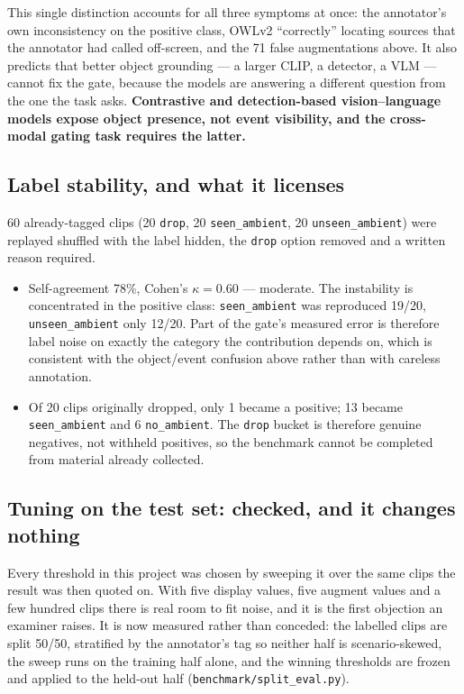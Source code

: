 \documentclass[11pt,a4paper]{article}
\begin{document}
This single distinction accounts for all three symptoms at once: the annotator's own
inconsistency on the positive class, OWLv2 ``correctly'' locating sources that the
annotator had called off-screen, and the 71 false augmentations above. It also predicts
that better object grounding --- a larger CLIP, a detector, a VLM --- cannot fix the
gate, because the models are answering a different question from the one the task asks.
\textbf{Contrastive and detection-based vision--language models expose object presence,
not event visibility, and the cross-modal gating task requires the latter.}

\subsection{Label stability, and what it licenses}\label{sec:readjudication}
60 already-tagged clips (20 \texttt{drop}, 20 \texttt{seen\_ambient}, 20
\texttt{unseen\_ambient}) were replayed shuffled with the label hidden, the
\texttt{drop} option removed and a written reason required.

\begin{itemize}
  \item Self-agreement 78\%, Cohen's $\kappa = 0.60$ --- moderate. The instability is
    concentrated in the positive class: \texttt{seen\_ambient} was reproduced 19/20,
    \texttt{unseen\_ambient} only 12/20. Part of the gate's measured error is therefore
    label noise on exactly the category the contribution depends on, which is consistent
    with the object/event confusion above rather than with careless annotation.
  \item Of 20 clips originally dropped, only 1 became a positive; 13 became
    \texttt{seen\_ambient} and 6 \texttt{no\_ambient}. The \texttt{drop} bucket is
    therefore genuine negatives, not withheld positives, so the benchmark cannot be
    completed from material already collected.
\end{itemize}

\subsection{Tuning on the test set: checked, and it changes nothing}\label{sec:spliteval}
Every threshold in this project was chosen by sweeping it over the same clips the result was then
quoted on. With five display values, five augment values and a few hundred clips there is real room
to fit noise, and it is the first objection an examiner raises. It is now measured rather than
conceded: the labelled clips are split 50/50, stratified by the annotator's tag so neither half is
scenario-skewed, the sweep runs on the training half alone, and the winning thresholds are frozen and
applied to the held-out half (\texttt{benchmark/split\_eval.py}).
\end{document}
